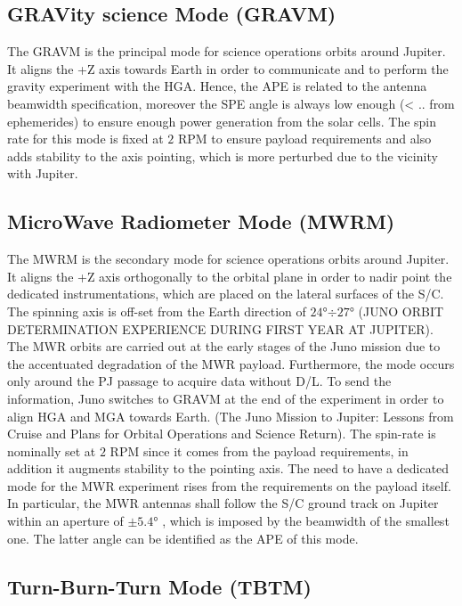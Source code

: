 \subsection{GRAVity science Mode (GRAVM)}
\label{subsec:grav_mode}

The GRAVM is the principal mode for science operations orbits around Jupiter. It aligns the +Z axis towards Earth in order to communicate and to perform the gravity experiment with the HGA. Hence, the APE is related to the antenna beamwidth specification, moreover the SPE angle is always low enough (< .. from ephemerides) to ensure enough power generation from the solar cells. 
The spin rate for this mode is fixed at $2$ RPM to ensure payload requirements and also adds stability to the axis pointing, which is more perturbed due to the vicinity with Jupiter. 

\subsection{MicroWave Radiometer Mode (MWRM)}
\label{subsec:mwr_mode}

The MWRM is the secondary mode for science operations orbits around Jupiter. It aligns the +Z axis orthogonally to the orbital plane in order to nadir point the dedicated instrumentations, which are placed on the lateral surfaces of the S/C. 
The spinning axis is off-set from the Earth direction of $24$°$\div$$27$° \mref (JUNO ORBIT DETERMINATION EXPERIENCE DURING FIRST YEAR AT JUPITER). 
The MWR orbits are carried out at the early stages of the Juno mission due to the accentuated degradation of the MWR payload. Furthermore, the mode occurs only around the PJ passage to acquire data without D/L.
To send the information, Juno switches to GRAVM at the end of the experiment in order to align HGA and MGA towards Earth. \mref (The Juno Mission to Jupiter: Lessons from Cruise and Plans for Orbital Operations and Science Return).
The spin-rate is nominally set at $2$ RPM since it comes from the payload requirements, in addition it augments stability to the pointing axis. 
The need to have a dedicated mode for the MWR experiment rises from the requirements on the payload itself. 
In particular, the MWR antennas shall follow the S/C ground track on Jupiter within an aperture of $\pm 5.4$° \mref, which is imposed by the beamwidth of the smallest one. 
The latter angle can be identified as the APE of this mode. 

\subsection{Turn-Burn-Turn Mode (TBTM)}
\label{subsec:tbt_mode}


